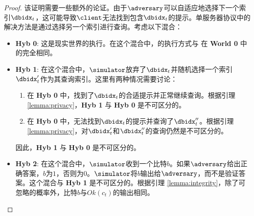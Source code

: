\begin{proof}
    该证明需要一些额外的论证。由于$\adversary$可以自适应地选择下一个索引$\dbidx_t$，这可能导致$\client$无法找到包含$\dbidx_t$的提示。单服务器协议中的解决方法是通过选择另一个索引进行查询。考虑以下混合：
    
    \begin{itemize}
        \item \textbf{Hyb 0}: 这是现实世界的执行。在这个混合中，\simulator 的执行方式与 \client 在 \textbf{World 0} 中的完全相同。
        \item \textbf{Hyb 1}: 在这个混合中，$\simulator$放弃了$\dbidx_t$并随机选择一个索引$\dbidx_t'$作为其查询索引。这里有两种情况需要讨论：
        \begin{enumerate}
            \item 在 \textbf{Hyb 0} 中，\simulator 找到了$\dbidx_t$的合适提示并正常继续查询。根据引理 \ref{lemma:privacy}，\textbf{Hyb 1} 与 \textbf{Hyb 0} 是不可区分的。
            \item 在 \textbf{Hyb 0} 中，\simulator 无法找到$\dbidx_t$的提示并查询了$\dbidx_t''$。根据引理 \ref{lemma:privacy}，对$\dbidx_t'$和$\dbidx_t''$的查询仍然是不可区分的。
        \end{enumerate}
        因此，\textbf{Hyb 1} 与 \textbf{Hyb 0} 是不可区分的。
        \item \textbf{Hyb 2}: 在这个混合中，$\simulator$收到一个比特$b$。如果$\adversary$给出正确答案，$b$为$1$，否则为$0$。$\simulator$将$b$输出给$\adversary$，而不是验证答案。这个混合与 \textbf{Hyb 1} 是不可区分的。根据引理 \ref{lemma:integrity}，除了可忽略的概率外，比特$b$与$Ok(c_t)$的输出相同。
    \end{itemize}
\end{proof}


